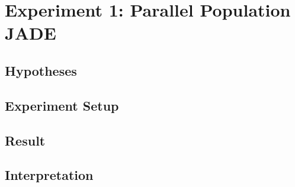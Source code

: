 \documentclass[./\jobname.tex]{subfiles}
\begin{document}
\chapter {Experiment 1: Parallel Population JADE}
\label{chap:experimet_1}

\section{Hypotheses}

\section{Experiment Setup}

\section{Result}

\section{Interpretation}
\end{document}

